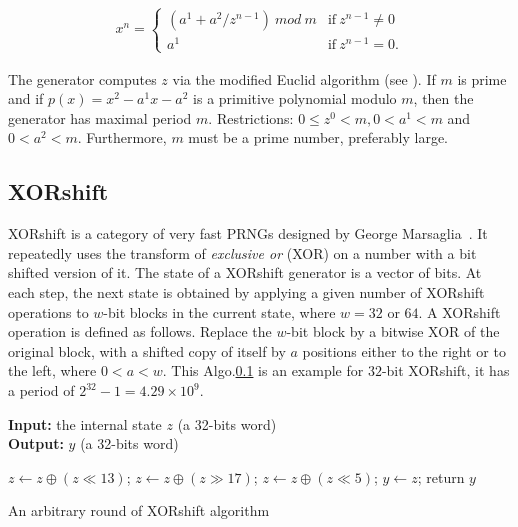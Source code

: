 \begin{equation}
\label{INV}
\begin{array}{l}
x^n=\left\{
\begin{array}{ll}
(a^1 + a^2 / z^{n-1})~mod~m & \text{if}~ z^{n-1} \neq 0 \\
a^1 & \text{if}~  z^{n-1} = 0 .\end{array} \right. \end{array}\end{equation}

The generator computes $z$ via the modified Euclid algorithm (see \cite{Lecuyer2009}). If $m$ is prime and if $p(x) = x^2 -a^1 x -a^2$ is a primitive polynomial modulo $m$, then the generator has maximal period $m$. Restrictions: $0 \leq z^0 < m, 0 < a^1 < m$ and $0 < a^2 < m$. Furthermore, $m$ must be a prime number, preferably large.


\subsection{XORshift}
\label{XORshift}

XORshift is a category of very fast PRNGs designed by George Marsaglia~\cite{Marsaglia2003}. It repeatedly uses the transform of \emph{exclusive or} (XOR) on a number with a bit shifted version of it. The state of a XORshift generator is a vector of bits. At each step, the next state is obtained by applying a given number of XORshift operations to $w$-bit blocks in the current state, where $w = 32$ or $64$. A XORshift operation is defined as follows. Replace the $w$-bit block by a bitwise XOR of the original block, with a shifted copy of itself by $a$ positions either to the right or to the left, where $ 0 < a < w$. This Algo.\ref{XORshift} is an example for $32$-bit XORshift, it has a period of $2^{32}-1=4.29\times10^9$.


\begin{algorithm}
\textbf{Input:} the internal state $z$ (a 32-bits word)\\
\textbf{Output:} $y$ (a 32-bits word)
\begin{algorithmic}[1]

\STATE$z\leftarrow{z\oplus{(z\ll13)}}$;
\STATE$z\leftarrow{z\oplus{(z\gg17)}}$;
\STATE$z\leftarrow{z\oplus{(z\ll5)}}$;
\STATE$y\leftarrow{z}$;
\STATE return $y$\;
\medskip
\caption{An arbitrary round of XORshift algorithm}
\label{XORshift}
\end{algorithmic}
\end{algorithm}

